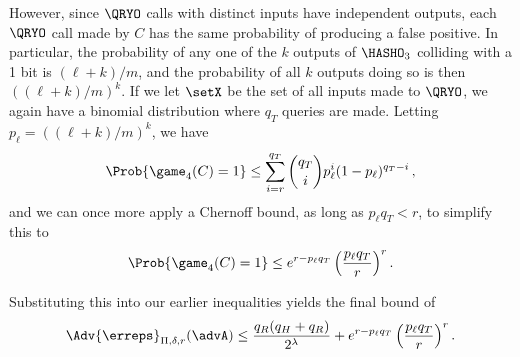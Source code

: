 However, since $\QRYO$ calls with distinct inputs have independent outputs, each $\QRYO$ call made by $C$ has the same probability of producing a false positive. In particular, the probability of any one of the $k$ outputs of $\HASHO_3$ colliding with a 1 bit is $(\ell+k)/m$, and the probability of all $k$ outputs doing so is then $((\ell+k)/m)^k$. If we let $\setX$ be the set of all inputs made to $\QRYO$, we again have a binomial distribution where $q_T$ queries are made. Letting $p_\ell = ((\ell+k)/m)^k$, we have
\begin{equation}
   \Prob{\game_4(C)=1} \le
     \sum_{i=r}^{q_T} \binom{q_T}{i}p_\ell^i(1-p_\ell)^{q_T-i} \,,
\end{equation}
and we can once more apply a Chernoff bound, as long as $p_\ell q_T < r$, to simplify this to
\begin{equation}
   \Prob{\game_4(C)=1} \le
     e^{r-p_\ell q_T}\left(\frac{p_\ell q_T}{r}\right)^r.
\end{equation}

Substituting this into our earlier inequalities yields the final bound of
\begin{equation}
   \Adv{\erreps}_{\Pi,\delta,r}(\advA) \leq
     \frac{q_R(q_H+q_R)}{2^\lambda} + e^{r-p_\ell q_T}\left(\frac{p_\ell q_T}{r}\right)^r.
\end{equation}

